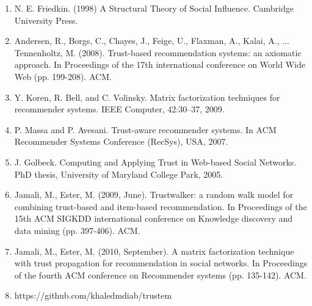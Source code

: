 \documentclass[11pt, conference, onecolumn]{IEEEtran}
\begin{document}
\begin{enumerate}
\item N. E. Friedkin. (1998) A Structural Theory of Social Influence. Cambridge University Press.
\item Andersen, R., Borgs, C., Chayes, J., Feige, U., Flaxman, A., Kalai, A., ...  Tennenholtz, M. (2008). Trust-based recommendation systems: an axiomatic approach. In Proceedings of the 17th international conference on World Wide Web (pp. 199-208). ACM.
\item Y. Koren, R. Bell, and C. Volinsky. Matrix factorization techniques for recommender systems. IEEE Computer, 42:30–37, 2009.
\item P. Massa and P. Avesani. Trust-aware recommender systems. In ACM Recommender Systems Conference (RecSys), USA, 2007.
\item J. Golbeck. Computing and Applying Trust in Web-based Social Networks. PhD thesis, University of Maryland College Park, 2005.
\item Jamali, M.,  Ester, M. (2009, June). Trustwalker: a random walk model for combining trust-based and item-based recommendation. In Proceedings of the 15th ACM SIGKDD international conference on Knowledge discovery and data mining (pp. 397-406). ACM.
\item Jamali, M.,  Ester, M. (2010, September). A matrix factorization technique with trust propagation for recommendation in social networks. In Proceedings of the fourth ACM conference on Recommender systems (pp. 135-142). ACM.
\item https://github.com/khaledmdiab/trustem

\end{enumerate}

   
    
\end{document}
